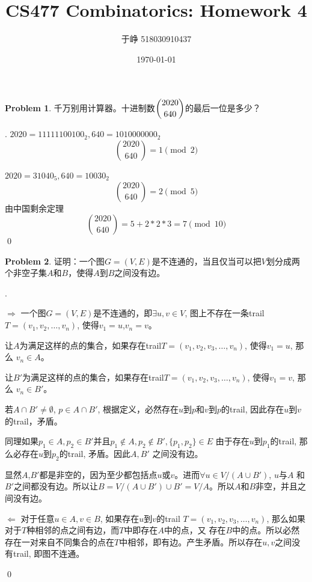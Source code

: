 \documentclass[UTF8]{ctexart}
\newenvironment{sol}
  {\par\vspace{3mm}\noindent{\it Solution}.}
  {\qed \\ \medskip}
\theoremstyle{definition}
\newtheorem{problem}{Problem}
\begin{document}
\title{CS477 Combinatorics: Homework 4}
\date{\today}
\author{于峥 518030910437}
\maketitle

\begin{problem}
千万别用计算器。十进制数$\dbinom{2020}{640}$的最后一位是多少？
\begin{sol}
  $2020=11111100100_2, 640=1010000000_2$
  $$
    \binom{2020}{640} = 1 \pmod 2
  $$

  $2020=31040_5, 640=10030_2$
  $$
    \binom{2020}{640} = 2 \pmod 5
  $$
  由中国剩余定理
  $$
    \binom{2020}{640} = 5 + 2*2*3 = 7 \pmod {10}
  $$
\end{sol}
\end{problem}

\begin{problem}
证明：一个图$G=(V, E)$是不连通的，当且仅当可以把$V$划分成两个非空子集$A$和$B$，使得$A$到$B$之间没有边。
\begin{sol}

  \textbf{$\Rightarrow$}
  一个图$G=(V, E)$是不连通的，即$\exists u, v \in V$, 图上不存在一条trail $T=
  (v_1,v_2,\dots, v_n) $, 使得$v_1=u$,$v_n=v$。

  让$A$为满足这样的点的集合，如果存在trail$T=(v_1, v_2, v_3, \dots, v_n)$, 使得$v_1 = u$, 那么
  $v_n \in A$。

  让$B'$为满足这样的点的集合，如果存在trail$T=(v_1, v_2, v_3, \dots, v_n)$, 使得$v_1 = v$, 那么
  $v_n \in B'$。

  若$A \cap B' \not= \emptyset$, $p \in A \cap B'$, 根据定义，必然存在$u$到$p$和$v$到$p$的trail,
  因此存在$u$到$v$的trail，矛盾。
  
  同理如果$p_1 \in A, p_2 \in B'$并且$p_1 \not\in A, p_2 \not\in B', 
  \{ p_1, p_2\} \in E $ 由于存在$u$到$p_1$的trail, 那么必存在$u$到$p_2$的trail, 矛盾。因此$A, B'$
  之间没有边。

  显然$A$,$B'$都是非空的，因为至少都包括点$u$或$v$。进而$\forall u \in V / (A\cup B')$, $u$与$A$
  和$B'$之间都没有边。所以让$B = V / (A\cup B') \cup B' = V / A$。所以$A$和$B$非空，并且之间没有边。

  \textbf{$\Leftarrow$} 对于任意$u \in A, v \in B$, 如果存在$u$到$v$的trail 
  $T=(v_1, v_2, v_3, \dots, v_n)$, 那么如果对于$T$种相邻的点之间有边，而$T$中即存在$A$中的点，又
  存在$B$中的点。所以必然存在一对来自不同集合的点在$T$中相邻，即有边。产生矛盾。所以存在$u, v$之间没有trail,
  即图不连通。

\end{sol}
\end{problem}
\end{document}
